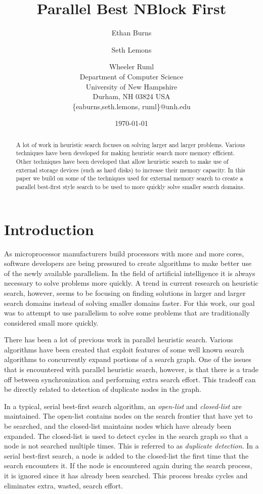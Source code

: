 \documentclass{article} \usepackage{aaai} \usepackage{graphicx}
\title{Parallel Best NBlock First}
\author{Ethan Burns \and Seth Lemons \and Wheeler Ruml \\
Department of Computer Science \\
University of New Hampshire \\
Durham, NH 03824 USA \\
\{eaburns,seth.lemons, ruml\}@unh.edu}
\date{\today}
\begin{document}
\maketitle

\begin{abstract}
A lot of work in heuristic search focuses on solving larger and larger
problems.  Various techniques have been developed for making heuristic
search more memory efficient.  Other techniques have been developed
that allow heuristic search to make use of external storage devices
(such as hard disks) to increase their memory capacity.  In this paper
we build on some of the techniques used for external memory search to
create a parallel best-first style search to be used to more quickly
solve smaller search domains.
\end{abstract}

\section{Introduction}

As microprocessor manufacturers build processors with more and more
cores, software developers are being pressured to create algorithms to
make better use of the newly available parallelism.  In the field of
artificial intelligence it is always necessary to solve problems more
quickly.  A trend in current research on heuristic search, however,
seems to be focusing on finding solutions in larger and larger search
domains instead of solving smaller domains faster.  For this work, our
goal was to attempt to use parallelism to solve some problems that are
traditionally considered small more quickly.

There has been a lot of previous work in parallel heuristic search.
Various algorithms have been created that exploit features of some
well known search algorithms to concurrently expand portions of a
search graph.  One of the issues that is encountered with parallel
heuristic search, however, is that there is a trade off between
synchronization and performing extra search effort.  This tradeoff can
be directly related to detection of duplicate nodes in the graph.

In a typical, serial best-first search algorithm, an \emph{open-list}
and \emph{closed-list} are maintained.  The open-list contains nodes
on the search frontier that have yet to be searched, and the
closed-list maintains nodes which have already been expanded.  The
closed-list is used to detect cycles in the search graph so that a
node is not searched multiple times.  This is referred to as
\emph{duplicate detection}.  In a serial best-first search, a node is
added to the closed-list the first time that the search encounters it.
If the node is encountered again during the search process, it is
ignored since it has already been searched.  This process breaks
cycles and eliminates extra, wasted, search effort.
\end{document}
